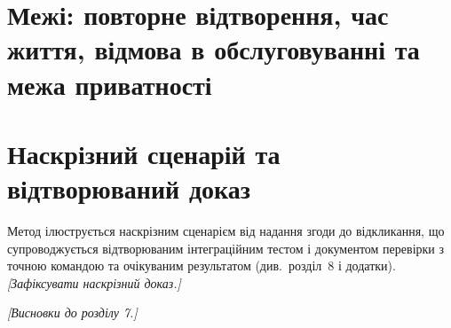 \section{Межі: повторне відтворення, час життя, відмова в обслуговуванні та межа приватності}
\label{sec:relay-limits}

\section{Наскрізний сценарій та відтворюваний доказ}
\label{sec:relay-e2e}
Метод ілюструється наскрізним сценарієм від надання згоди до відкликання, що супроводжується відтворюваним інтеграційним тестом і документом перевірки з точною командою та очікуваним результатом (див.\ розділ~8 і додатки). \emph{[Зафіксувати наскрізний доказ.]}

\emph{[Висновки до розділу 7.]}
